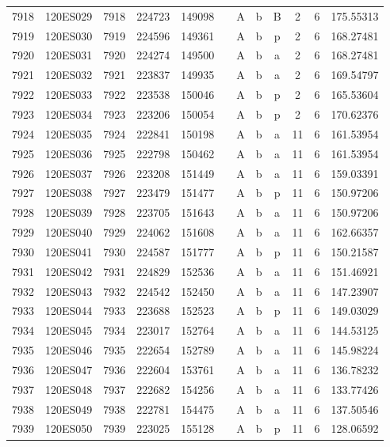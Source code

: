 \begin{tabular}{|*{12}{c|}}
7918 & 120ES029 & 7918 & 224723 & 149098 &  & A & b & B & 2 & 6 & 175.55313 \\ 
7919 & 120ES030 & 7919 & 224596 & 149361 &  & A & b & p & 2 & 6 & 168.27481 \\ 
7920 & 120ES031 & 7920 & 224274 & 149500 &  & A & b & a & 2 & 6 & 168.27481 \\ 
7921 & 120ES032 & 7921 & 223837 & 149935 &  & A & b & a & 2 & 6 & 169.54797 \\ 
7922 & 120ES033 & 7922 & 223538 & 150046 &  & A & b & p & 2 & 6 & 165.53604 \\ 
7923 & 120ES034 & 7923 & 223206 & 150054 &  & A & b & p & 2 & 6 & 170.62376 \\ 
7924 & 120ES035 & 7924 & 222841 & 150198 &  & A & b & a & 11 & 6 & 161.53954 \\ 
7925 & 120ES036 & 7925 & 222798 & 150462 &  & A & b & a & 11 & 6 & 161.53954 \\ 
7926 & 120ES037 & 7926 & 223208 & 151449 &  & A & b & a & 11 & 6 & 159.03391 \\ 
7927 & 120ES038 & 7927 & 223479 & 151477 &  & A & b & p & 11 & 6 & 150.97206 \\ 
7928 & 120ES039 & 7928 & 223705 & 151643 &  & A & b & a & 11 & 6 & 150.97206 \\ 
7929 & 120ES040 & 7929 & 224062 & 151608 &  & A & b & a & 11 & 6 & 162.66357 \\ 
7930 & 120ES041 & 7930 & 224587 & 151777 &  & A & b & p & 11 & 6 & 150.21587 \\ 
7931 & 120ES042 & 7931 & 224829 & 152536 &  & A & b & a & 11 & 6 & 151.46921 \\ 
7932 & 120ES043 & 7932 & 224542 & 152450 &  & A & b & a & 11 & 6 & 147.23907 \\ 
7933 & 120ES044 & 7933 & 223688 & 152523 &  & A & b & p & 11 & 6 & 149.03029 \\ 
7934 & 120ES045 & 7934 & 223017 & 152764 &  & A & b & a & 11 & 6 & 144.53125 \\ 
7935 & 120ES046 & 7935 & 222654 & 152789 &  & A & b & a & 11 & 6 & 145.98224 \\ 
7936 & 120ES047 & 7936 & 222604 & 153761 &  & A & b & a & 11 & 6 & 136.78232 \\ 
7937 & 120ES048 & 7937 & 222682 & 154256 &  & A & b & a & 11 & 6 & 133.77426 \\ 
7938 & 120ES049 & 7938 & 222781 & 154475 &  & A & b & a & 11 & 6 & 137.50546 \\ 
7939 & 120ES050 & 7939 & 223025 & 155128 &  & A & b & p & 11 & 6 & 128.06592 \\ 

\end{tabular}
